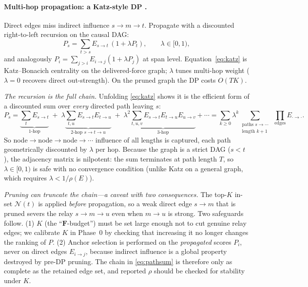 \documentclass[11pt]{article}
\newcommand{\F}{\mathbf{F}}
\begin{document}
\paragraph{Multi-hop propagation: a Katz-style DP \cite{katz1953new}.}
Direct edges miss indirect influence $s\!\to\!m\!\to\!t$. Propagate with a discounted right-to-left
recursion on the causal DAG:
\begin{equation}
P_s=\sum_{t>s}E_{s\to t}\,(1+\lambda P_t),\qquad \lambda\in[0,1),
\label{eq:katz}
\end{equation}
and analogously $P_i=\sum_{j>i}E_{i\to j}(1+\lambda P_j)$ at span level. Equation~\eqref{eq:katz} is
Katz--Bonacich centrality on the delivered-force graph; $\lambda$ tunes multi-hop weight
($\lambda{=}0$ recovers direct out-strength). On the pruned graph the DP costs $O(TK)$.

\emph{The recursion is the full chain.} Unfolding \eqref{eq:katz} shows it is the efficient form of a
discounted sum over \emph{every} directed path leaving $s$:
\begin{equation}
P_s=\underbrace{\sum_{t}E_{s\to t}}_{\text{1-hop}}
\;+\;\lambda\underbrace{\sum_{t,u}E_{s\to t}E_{t\to u}}_{\text{2-hop }s\to t\to u}
\;+\;\lambda^2\!\!\underbrace{\sum_{t,u,v}E_{s\to t}E_{t\to u}E_{u\to v}}_{\text{3-hop}}+\cdots
=\sum_{k\ge0}\lambda^{k}\!\!\sum_{\substack{\text{paths }s\to\cdots\\ \text{length }k+1}}\;\prod_{\text{edges}}E_{\cdot\to\cdot}.
\label{eq:pathsum}
\end{equation}
So node$\to$node$\to$node$\to\cdots$ influence of all lengths is captured, each path geometrically
discounted by $\lambda$ per hop. Because the graph is a strict DAG ($s<t$), the adjacency matrix is
nilpotent: the sum terminates at path length $T$, so $\lambda\in[0,1)$ is safe with no convergence
condition (unlike Katz on a general graph, which requires $\lambda<1/\rho(E)$).

\emph{Pruning can truncate the chain---a caveat with two consequences.} The top-$K$ in-set
$\mathcal N(t)$ is applied \emph{before} propagation, so a weak direct edge $s\to m$ that is pruned
severs the relay $s\to m\to u$ even when $m\to u$ is strong. Two safeguards follow. (1) $K$ (the
``$\F$-budget'') must be set large enough not to cut genuine relay edges; we calibrate $K$ in Phase~0
by checking that increasing it no longer changes the ranking of $P$. (2) Anchor selection is performed
on the \emph{propagated} scores $P_i$, never on direct edges $E_{i\to j}$, because indirect influence
is a global property destroyed by pre-DP pruning. The chain in \eqref{eq:pathsum} is therefore only as
complete as the retained edge set, and reported $\rho$ should be checked for stability under $K$.
\end{document}
